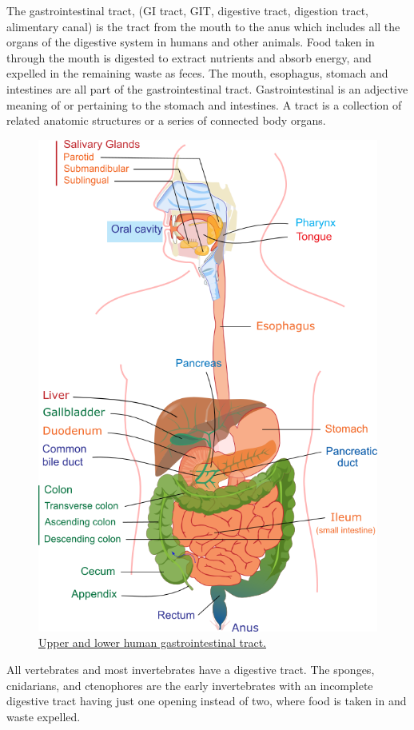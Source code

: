 The gastrointestinal tract, (GI tract, GIT, digestive tract, digestion tract, alimentary canal) is the tract from the mouth to the anus which includes all the organs of the digestive system in humans and other animals. Food taken in through the mouth is digested to extract nutrients and absorb energy, and expelled in the remaining waste as feces. The mouth, esophagus, stomach and intestines are all part of the gastrointestinal tract. Gastrointestinal is an adjective meaning of or pertaining to the stomach and intestines. A tract is a collection of related anatomic structures or a series of connected body organs.



\begin{figure}

{\centering \includegraphics[width=0.7\linewidth]{./figures/digestive/Digestive_system_diagram_edit} 

}

\caption{\href{https://en.wikipedia.org/wiki/File:Digestive_system_diagram_edit.svg}{Upper and lower human gastrointestinal tract.}}\label{fig:upperlowergitract}
\end{figure}

All vertebrates and most invertebrates have a digestive tract. The sponges, cnidarians, and ctenophores are the early invertebrates with an incomplete digestive tract having just one opening instead of two, where food is taken in and waste expelled.

